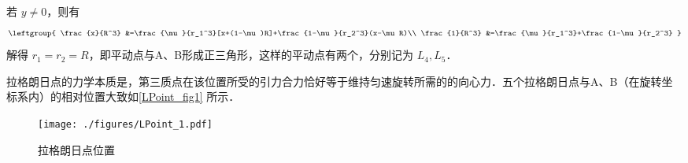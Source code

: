 若 $y\neq 0$，则有
\begin{equation}%
\leftgroup{
\frac{x}{R^3} &=\frac{\mu}{r_1^3}[x+(1-\mu)R]+\frac{1-\mu}{r_2^3}(x-\mu R)\\
\frac{1}{R^3} &=\frac{\mu}{r_1^3}+\frac{1-\mu}{r_2^3}
}
\end{equation}
解得 $r_1=r_2=R$，即平动点与A、B形成正三角形，这样的平动点有两个，分别记为 $L_4,L_5$．

拉格朗日点的力学本质是，第三质点在该位置所受的引力合力恰好等于维持匀速旋转所需的的向心力．五个拉格朗日点与A、B（在旋转坐标系内）的相对位置大致如\autoref{LPoint_fig1} 所示．
\begin{figure}[ht]
\centering
\texttt{[image: ./figures/LPoint\_1.pdf]}
\caption{拉格朗日点位置} \label{LPoint_fig1}
\end{figure}
